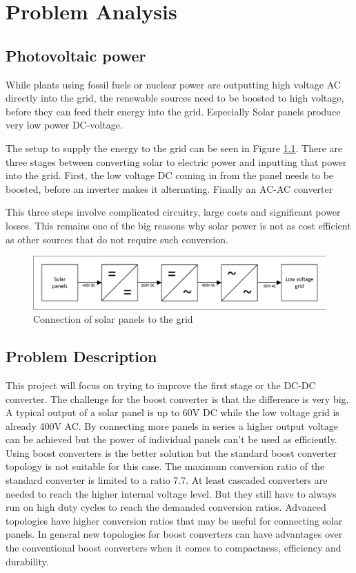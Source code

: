 \chapter{Problem Analysis}\label{ch:probdesc}



\section{Photovoltaic power}
While plants using fossil fuels or nuclear power are outputting high voltage AC directly into the grid, the renewable sources need to be boosted to high voltage, before they can feed their energy into the grid. 
Especially Solar panels produce very low power DC-voltage. \cite{PanasonicSolarPanel}

The setup to supply the energy to the grid can be seen in Figure \ref{fig:SolarConverters}.
There are three stages between converting solar to electric power and inputting that power into the grid. 
First, the low voltage DC coming in from the panel needs to be boosted, before an inverter makes it alternating. Finally  an AC-AC converter 

This three steps involve complicated circuitry, large costs and significant power losses. 
This remains one of the big reasons why solar power is not as cost efficient as other sources that do not require such conversion.

\begin{figure}[H]
   \centering
   \includegraphics[width=\textwidth]{figures/Problem/SolarConverters.pdf}
    \caption{Connection of solar panels to the grid}
	\label{fig:SolarConverters}
\end{figure}

\section{Problem Description}
This project will focus on trying to improve the first stage or the DC-DC converter. 
The challenge for the boost converter is that the difference is very big.
A typical output of a solar panel is up to 60V DC while the low voltage grid is already 400V AC.
By connecting more panels in series a higher output voltage can be achieved but the power of individual panels can't be used as efficiently.
Using boost converters is the better solution but the standard boost converter topology is not suitable for this case. 
The maximum conversion ratio of the standard converter is limited to a ratio 7.7.
At least cascaded converters are needed to reach the higher internal voltage level.
But they still have to always run on high duty cycles to reach the demanded conversion ratios.
Advanced topologies have higher conversion ratios that may be useful for connecting solar panels.
In general new topologies for boost converters can have advantages over the conventional boost converters when it comes to compactness, efficiency and durability.

 
